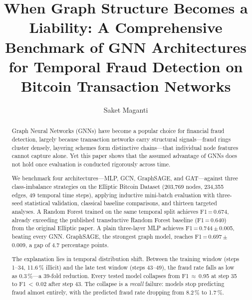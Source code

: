 \documentclass[preprint,12pt,a4paper]{elsarticle}
\def\corref#1{}%
\begin{document}
\begin{frontmatter}

\title{When Graph Structure Becomes a Liability: A Comprehensive
Benchmark of GNN Architectures for Temporal Fraud Detection on
Bitcoin Transaction Networks}

\author[vit]{Saket Maganti\corref{cor1}}
\address[vit]{School of Computer Science and Engineering,
VIT-AP University, Amaravati, Andhra Pradesh 522237, India}

\begin{abstract}
Graph Neural Networks (GNNs) have become a popular choice for financial
fraud detection, largely because transaction networks carry structural
signals---fraud rings cluster densely, layering schemes form distinctive
chains---that individual node features cannot capture alone. Yet this
paper shows that the assumed advantage of GNNs does not hold once
evaluation is conducted rigorously across time.

We benchmark four architectures---MLP, GCN, GraphSAGE, and GAT---against
three class-imbalance strategies on the Elliptic Bitcoin Dataset
(203,769 nodes, 234,355 edges, 49 temporal time steps), applying
inductive mini-batch evaluation with three-seed statistical validation,
classical baseline comparisons, and thirteen targeted analyses.
A Random Forest trained on the same temporal split achieves
F1\,=\,0.674, already exceeding the published transductive Random
Forest baseline (F1\,=\,0.640) from the original Elliptic paper. A
plain three-layer MLP achieves F1\,=\,0.744\,$\pm$\,0.005, beating
every GNN. GraphSAGE, the strongest graph model, reaches
F1\,=\,0.697\,$\pm$\,0.009, a gap of 4.7 percentage points.

The explanation lies in temporal distribution shift. Between the
training window (steps 1--34, 11.6\,\% illicit) and the late test
window (steps 43--49), the fraud rate falls as low as 0.3\,\%---a
39-fold reduction. Every tested model collapses from
F1\,$\approx$\,0.95 at step 35 to F1\,$<$\,0.02 after step 43.
The collapse is a \emph{recall} failure: models stop predicting
fraud almost entirely, with the predicted fraud rate dropping from
8.2\,\% to 1.7\,\%.


\end{abstract}
\end{frontmatter}
\end{document}
